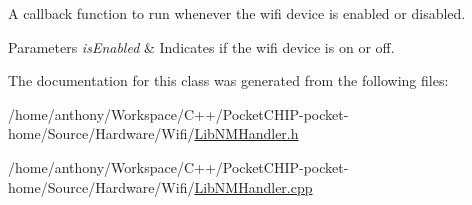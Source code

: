 A callback function to run whenever the wifi device is enabled or disabled.


\begin{DoxyParams}{Parameters}
{\em is\+Enabled} & Indicates if the wifi device is on or off. \\
\hline
\end{DoxyParams}


The documentation for this class was generated from the following files\+:\begin{DoxyCompactItemize}
\item 
/home/anthony/\+Workspace/\+C++/\+Pocket\+C\+H\+I\+P-\/pocket-\/home/\+Source/\+Hardware/\+Wifi/\mbox{\hyperlink{LibNMHandler_8h}{Lib\+N\+M\+Handler.\+h}}\item 
/home/anthony/\+Workspace/\+C++/\+Pocket\+C\+H\+I\+P-\/pocket-\/home/\+Source/\+Hardware/\+Wifi/\mbox{\hyperlink{LibNMHandler_8cpp}{Lib\+N\+M\+Handler.\+cpp}}\end{DoxyCompactItemize}
